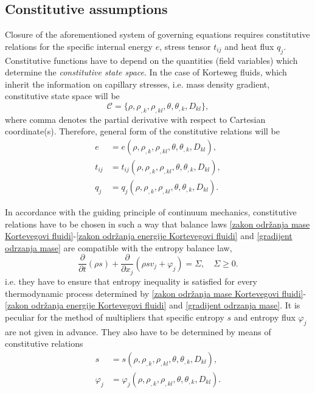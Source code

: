 \documentclass[a4paper,fleqn]{cas-sc}
\theoremstyle{definition}
\begin{document}
\subsection{Constitutive assumptions} 

Closure of the aforementioned system of governing equations requires constitutive relations for the specific internal energy $e$, stress tensor $t_{ij}$ and heat flux $q_{j}$. Constitutive functions have to depend on the quantities (field variables) which determine the \emph{constitutive state space}. In the case of Korteweg fluids, which inherit the information on capillary stresses, i.e. mass density gradient, constitutive state space will be 
\begin{equation} \label{CSS_Korteweg}
	\mathcal{C} = \{ \rho, \rho_{,k}, \rho_{,kl}, \theta, \theta_{,k}, D_{kl} \},  
\end{equation}
where comma denotes the partial derivative with respect to Cartesian coordinate(s). 
Therefore, general form of the constitutive relations will be
\begin{align} \label{konstitutivne relacije 1 opste}
	e & = e(\rho, \rho_{,k},  \rho_{,kl}, \theta, \theta_{,k}, D_{kl}), 
	\nonumber \\
	t_{ij} & = t_{ij}(\rho, \rho_{,k},  \rho_{,kl}, \theta, \theta_{,k}, D_{kl}), 
	\\ 
	q_{j} & = q_{j}(\rho, \rho_{,k},  \rho_{,kl}, \theta, \theta_{,k}, D_{kl}). 
	\nonumber
\end{align}

In accordance with the guiding principle of continuum mechanics, constitutive relations have to be chosen in such a way that balance laws \eqref{zakon održanja mase Kortevegovi fluidi}-\eqref{zakon održanja energije Kortevegovi fluidi} and \eqref{gradijent odrzanja mase} are compatible with the entropy balance law, 
\begin{equation} \label{bilans entropije Kortevegovi fluidi}
	\dfrac{\partial}{\partial t}\left(\rho s\right)+\dfrac{\partial}{\partial x_j}\left(\rho sv_j+\varphi_j\right) = \Sigma, \quad \Sigma \geq 0.
\end{equation}
i.e. they have to ensure that entropy inequality is satisfied for every thermodynamic process determined by \eqref{zakon održanja mase Kortevegovi fluidi}-\eqref{zakon održanja energije Kortevegovi fluidi} and \eqref{gradijent odrzanja mase}. It is peculiar for the method of multipliers that specific entropy $s$ and entropy flux $\varphi_{j}$ are not given in advance. They also have to be determined by means of constitutive relations
\begin{align} \label{konstitutivne relacije s-phi opste}
	s & = s(\rho, \rho_{,k},  \rho_{,kl}, \theta, \theta_{,k}, D_{kl}), \\
	\varphi_j & = \varphi_j(\rho, \rho_{,k},  \rho_{,kl}, \theta, \theta_{,k}, D_{kl}). 
	\nonumber 
\end{align}
\end{document}
